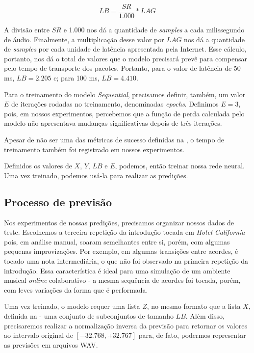 \begin{equation}
    LB = \frac{SR}{1.000} * LAG
\end{equation}

A divisão entre $SR$ e 1.000 nos dá a quantidade de \textit{samples} a cada milissegundo de áudio. Finalmente, a multiplicação desse valor por $LAG$ nos dá a quantidade de \textit{samples} por cada unidade de latência apresentada pela Internet. Esse cálculo, portanto, nos dá o total de valores que o modelo precisará prevê para compensar pelo tempo de transporte dos pacotes. Portanto, para o valor de latência de 50 ms, $LB = 2.205$ e; para 100 ms, $LB = 4.410$.

Para o treinamento do modelo \textit{Sequential}, precisamos definir, também, um valor $E$ de iterações rodadas no treinamento, denominadas \textit{epochs}. Definimos $E = 3$, pois, em nossos experimentos, percebemos que a função de perda calculada pelo modelo não apresentava mudanças significativas depois de três iterações.

Apesar de não ser uma das métricas de sucesso definidas na , o tempo de treinamento também foi registrado em nossos experimentos.

Definidos os valores de $X$, $Y$, $LB$ e $E$, podemos, então treinar nossa rede neural. Uma vez treinado, podemos usá-la para realizar as predições.

\subsection{Processo de previsão}

Nos experimentos de nossas predições, precisamos organizar nossos dados de teste. Escolhemos a terceira repetição da introdução tocada em \textit{Hotel California} pois, em análise manual, soaram semelhantes entre si, porém, com algumas pequenas improvizações. Por exemplo, em algumas transições entre acordes, é tocado uma nota intermediária, o que não foi observado na primeira repetição da introdução. Essa característica é ideal para uma simulação de um ambiente musical \textit{online} colaborativo - a mesma sequência de acordes foi tocada, porém, com leves variações da forma que é performada.

Uma vez treinado, o modelo requer uma lista $Z$, no mesmo formato que a lista $X$, definida na  - uma conjunto de subconjuntos de tamanho $LB$. Além disso, precisaremos realizar a normalização inversa da previsão para retornar os valores ao intervalo original de $[-32.768, +32.767]$ para, de fato, podermos representar as previsões em arquivos WAV.

